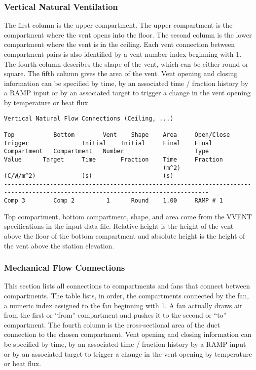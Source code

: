 \subsubsection{Vertical Natural Ventilation}

The first column is the upper compartment.  The upper compartment is the compartment where the vent opens into the floor.  The second column is the lower compartment where the vent is in the ceiling. Each vent connection between compartment pairs is also identified by a vent number index beginning with 1. The fourth column describes the shape of the vent, which can be either round or square.  The fifth column gives the area of the vent. Vent opening and closing information can be specified by time, by an associated time / fraction history by a RAMP input or by an associated target to trigger a change in the vent opening by temperature or heat flux.
\begin{lstlisting}[basicstyle=\tiny]
Vertical Natural Flow Connections (Ceiling, ...)

Top           Bottom        Vent    Shape    Area     Open/Close  Trigger               Initial    Initial     Final    Final
Compartment   Compartment   Number                    Type        Value      Target     Time       Fraction    Time     Fraction
                                             (m^2)                (C/W/m^2)             (s)                    (s)
--------------------------------------------------------------------------------------------------------------------------------
Comp 3        Comp 2         1      Round    1.00     RAMP # 1
\end{lstlisting}
Top compartment, bottom compartment, shape, and area come from the VVENT specifications in the input data file. Relative height is the height of the vent above the floor of the bottom compartment and absolute height is the height of the vent above the station elevation.

\subsubsection{Mechanical Flow Connections}

This section lists all connections to compartments and fans that connect between compartments. The table lists, in order, the compartments connected by the fan, a numeric index assigned to the fan beginning with 1.  A fan actually draws air from the first or ``from'' compartment and pushes it to the second or ``to'' compartment. The fourth column is the cross-sectional area of the duct connection to the chosen compartment. Vent opening and closing information can be specified by time, by an associated time / fraction history by a RAMP input or by an associated target to trigger a change in the vent opening by temperature or heat flux.


